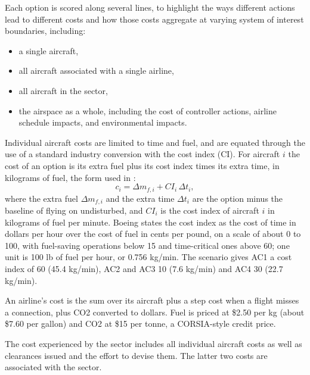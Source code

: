 Each option is scored along several lines, to highlight the ways different actions lead to different costs and how those costs aggregate at varying system of interest boundaries, including:
\begin{itemize}
    \item a single aircraft,
    \item all aircraft associated with a single airline,
    \item all aircraft in the sector,
    \item the airspace as a whole, including the cost of controller actions, airline schedule impacts, and environmental impacts.
\end{itemize}


Individual aircraft costs are limited to time and fuel, and are equated through the use of a standard industry conversion with the cost index (CI). For aircraft $i$ the cost of an option is its extra fuel plus its cost index times its extra time, in kilograms of fuel, the form used in \cite{mori2022massCruise}:
\begin{equation}
c_i = \Delta m_{f,i} + \mathit{CI}_i\, \Delta t_i ,
\label{eq:ac-cost}
\end{equation}
where the extra fuel $\Delta m_{f,i}$ and the extra time $\Delta t_i$ are the option minus the baseline of flying on undisturbed, and $\mathit{CI}_i$ is the cost index of aircraft $i$ in kilograms of fuel per minute. Boeing states the cost index as the cost of time in dollars per hour over the cost of fuel in cents per pound, on a scale of about 0 to 100, with fuel-saving operations below 15 and time-critical ones above 60; one unit is 100 lb of fuel per hour, or 0.756 kg/min. The scenario gives AC1 a cost index of 60 (45.4 kg/min), AC2 and AC3 10 (7.6 kg/min) and AC4 30 (22.7 kg/min).

An airline's cost is the sum over its aircraft plus a step cost when a flight misses a connection, plus CO2 converted to dollars. Fuel is priced at \$2.50 per kg (about \$7.60 per gallon) and CO2 at \$15 per tonne, a CORSIA-style credit price.

The cost experienced by the sector includes all individual aircraft costs as well as clearances issued and the effort to devise them. The latter two costs are associated with the sector.

